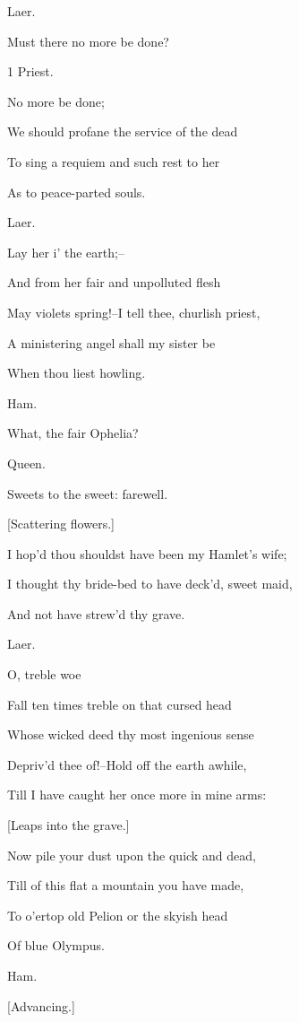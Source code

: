 \documentclass[12pt]{book}
\begin{document}
Laer.

Must there no more be done?



1 Priest.

No more be done;

We should profane the service of the dead

To sing a requiem and such rest to her

As to peace-parted souls.



Laer.

Lay her i' the earth;--

And from her fair and unpolluted flesh

May violets spring!--I tell thee, churlish priest,

A ministering angel shall my sister be

When thou liest howling.



Ham.

What, the fair Ophelia?



Queen.

Sweets to the sweet: farewell.

[Scattering flowers.]

I hop'd thou shouldst have been my Hamlet's wife;

I thought thy bride-bed to have deck'd, sweet maid,

And not have strew'd thy grave.



Laer.

O, treble woe

Fall ten times treble on that cursed head

Whose wicked deed thy most ingenious sense

Depriv'd thee of!--Hold off the earth awhile,

Till I have caught her once more in mine arms:

[Leaps into the grave.]

Now pile your dust upon the quick and dead,

Till of this flat a mountain you have made,

To o'ertop old Pelion or the skyish head

Of blue Olympus.



Ham.

[Advancing.]
\end{document}
